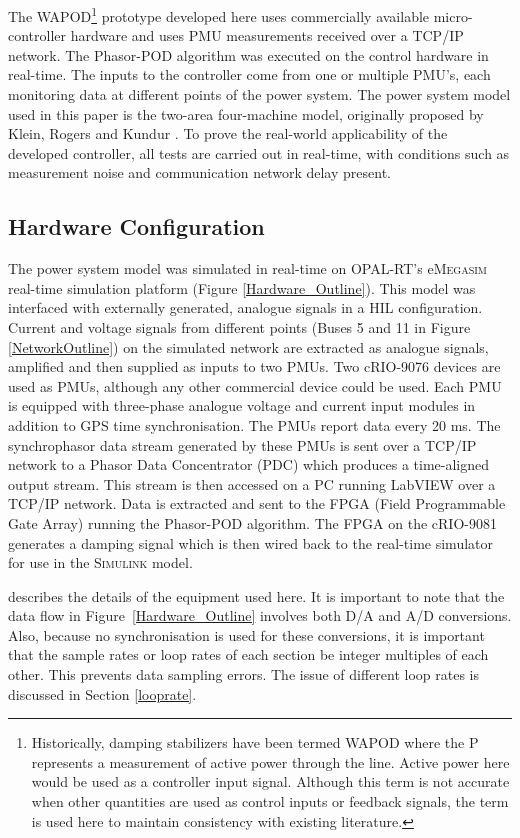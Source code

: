 \documentclass{ieeeaccess}
\begin{document}
The WAPOD\footnote{Historically, damping stabilizers have been termed WAPOD where the P represents a measurement of active power through the line. Active power here would be used as a controller input signal. Although this term is not accurate when other quantities are used as control inputs or feedback signals, the term is used here to maintain consistency with existing literature.} prototype developed here uses commercially available micro-controller hardware and uses PMU measurements received over a TCP/IP network. The Phasor-POD algorithm \cite{PhasorPOD} was executed on the control hardware in real-time. The inputs to the controller come from one or multiple PMU's, each monitoring data at different points of the power system. The power system model used in this paper is the two-area four-machine model, originally proposed by Klein, Rogers and Kundur \cite{KundurTwoArea}. To prove the real-world applicability of the developed controller, all tests are carried out in real-time, with conditions such as measurement noise and communication network delay present.

\subsection{Hardware Configuration}
The power system model was simulated in real-time on OPAL-RT's e\textsc{Megasim} \cite{eMEGASIM} real-time simulation platform (Figure \ref {Hardware_Outline}). This model was interfaced with externally generated, analogue signals in a HIL configuration. Current and voltage signals from different points (Buses 5 and 11 in Figure \ref{NetworkOutline}) on the simulated network are extracted as analogue signals, amplified and then supplied as inputs to two PMUs. Two cRIO-9076 \cite{cRIO9081} devices are used as PMUs, although any other commercial device could be used. Each PMU is equipped with three-phase analogue voltage and current input modules in addition to GPS time synchronisation. The PMUs report data every 20 ms. The synchrophasor data stream  generated by these PMUs is sent over a TCP/IP network to a Phasor Data Concentrator (PDC) which produces a time-aligned output stream. This stream is then accessed on a PC running LabVIEW over a TCP/IP network. Data is extracted and sent to the FPGA (Field Programmable Gate Array) running the Phasor-POD algorithm. The FPGA on the cRIO-9081 \cite{cRIO9081} generates a damping signal which is then wired back to the real-time simulator for use in the \textsc{Simulink} model.

\cite{PhasorPODImplement} describes the details of the equipment used here. It is important to note that the data flow in Figure~\ref{Hardware_Outline} involves both D/A and A/D conversions. Also, because no synchronisation is used for these conversions, it is important that the sample rates or loop rates of each section be integer multiples of each other. This prevents data sampling errors. The issue of different loop rates is discussed in Section \ref{looprate}.
\end{document}
